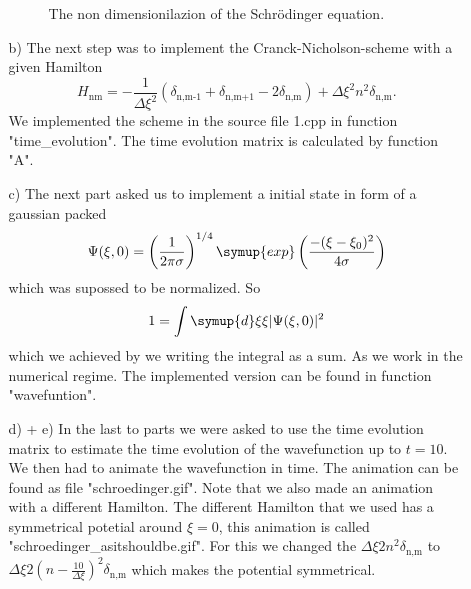\begin{itemize}
\begin{itemize}
\begin{figure}
            \caption{The non dimensionilazion of the Schrödinger equation.}
        \end{figure}
        \FloatBarrier
        \item[b)]
        The next step was to implement the Cranck-Nicholson-scheme with a given Hamilton
        \begin{equation}
            H_\text{nm} = - \frac{1}{\Delta \xi ^2} (\delta_\text{n,m-1} + \delta_\text{n,m+1} - 2\delta_\text{n,m}) + \Delta \xi^2 n^2 \delta_\text{n,m} . 
        \end{equation}
        We implemented the scheme in the source file 1.cpp in function "time\_evolution".
        The time evolution matrix is calculated by function "A".
        \item[c)]
        The next part asked us to implement a initial state in form of a gaussian packed 
        \begin{equation}
            \Psi(\xi,0) = \left(\frac{1}{2\pi\sigma}\right)^{1/4} \symup{exp}\left(\frac{-(\xi - \xi_0)^2}{4\sigma}\right)
        \end{equation}
        which was supossed to be normalized.
        So
        \begin{equation}
            1 = \int \symup{d}\xi \xi |\Psi(\xi,0)|^2
        \end{equation}
        which we achieved by we writing the integral as a sum.
        As we work in the numerical regime.
        The implemented version can be found in function "wavefuntion".
        \item[d) + e)]
        In the last to parts we were asked to use the time evolution matrix to estimate the time evolution of the wavefunction up to $t=10$.
        We then had to animate the wavefunction in time.
        The animation can be found as file "schroedinger.gif".
        Note that we also made an animation with a different Hamilton.
        The different Hamilton that we used has a symmetrical potetial around $\xi = 0$, this animation is called "schroedinger\_asitshouldbe.gif".
        For this we changed the $\Delta \xi 2n^2 \delta_\text{n,m}$ to $\Delta \xi 2(n - \frac{10}{\Delta \xi})^2 \delta_\text{n,m}$ which makes the potential symmetrical.

    \end{itemize}
\end{itemize}
